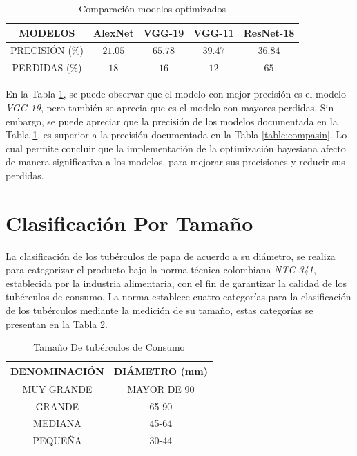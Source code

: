 		\begin{table}[ht]
			\centering
			\begin{tabular}{|c|c|c|c|c|}
				\hline
				MODELOS & AlexNet & VGG-19 & VGG-11 & ResNet-18 \\
				\hline
				PRECISIÓN (\%) & $$21.05$$ & $$65.78$$ & $$39.47$$ & $$36.84$$ \\
				\hline
				PERDIDAS (\%) & $$18$$ & $$16$$ & $$12$$ & $$65$$ \\
				\hline
			\end{tabular}	
			\caption{Comparación modelos optimizados}
			\label{table:compacon}
		\end{table}	
		
		En la Tabla \ref{table:compacon}, se puede observar que el modelo con mejor precisión es el modelo \textit{VGG-19}, pero también se aprecia que es el modelo con mayores perdidas. Sin embargo, se puede apreciar que la precisión de los modelos documentada en la Tabla \ref{table:compacon}, es superior a la precisión documentada en la Tabla \ref{table:compasin}. Lo cual permite concluir que la implementación de la optimización bayesiana afecto de manera significativa a los modelos, para mejorar sus precisiones y reducir sus perdidas.
	
	
	\newpage		
	\section{Clasificación Por Tamaño}
	
	La clasificación de los tubérculos de papa de acuerdo a su diámetro, se realiza para categorizar el producto bajo la norma técnica colombiana \textit{NTC 341}, establecida por la industria alimentaria, con el fin de garantizar la calidad de los tubérculos de consumo. 	La norma establece cuatro categorías para la clasificación de los tubérculos mediante la medición de su tamaño, estas categorías se presentan en la Tabla \ref{table:limites}.
		
	\begin{table}[ht]
		\centering
		\begin{tabular}{|c|c|}
			\hline
			DENOMINACIÓN & DIÁMETRO (mm) \\
			\hline
			MUY GRANDE & MAYOR DE 90 \\
			\hline
			GRANDE & 65-90 \\
			\hline
			MEDIANA	& 45-64 \\
			\hline
			PEQUEÑA & 30-44 \\
			\hline
		\end{tabular}	
		\caption{Tamaño De tubérculos de Consumo}
		\label{table:limites}
	\end{table}	
	
